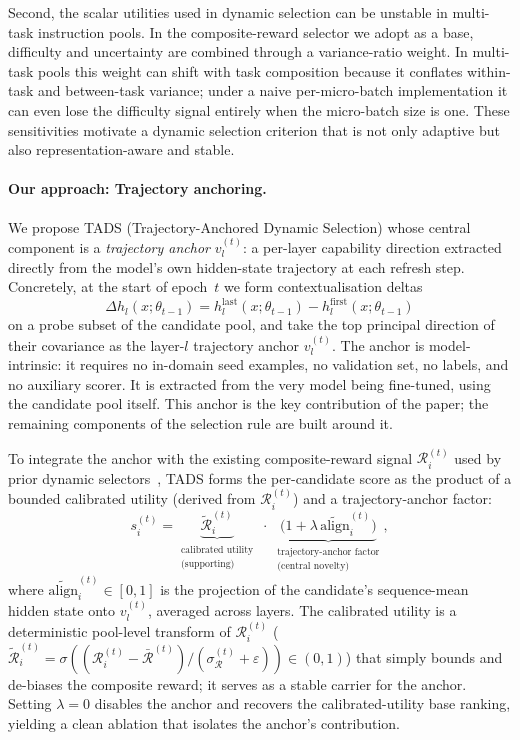 Second, the scalar utilities used in dynamic selection can be
unstable in multi-task instruction pools. In the composite-reward
selector we adopt as a base, difficulty and uncertainty are
combined through a variance-ratio weight. In multi-task pools this
weight can shift with task composition because it conflates
within-task and between-task variance; under a naive
per-micro-batch implementation it can even lose the difficulty
signal entirely when the micro-batch size is one. These
sensitivities motivate a dynamic selection criterion that is not
only adaptive but also representation-aware and stable.

\paragraph{Our approach: Trajectory anchoring.}
We propose \textsc{TADS} (Trajectory-Anchored Dynamic Selection)
whose central component is a \emph{trajectory anchor}
$v_l^{(t)}$: a per-layer capability direction extracted directly
from the model's own hidden-state trajectory at each refresh step.
Concretely, at the start of epoch~$t$ we form contextualisation
deltas
\[
\Delta h_l(x;\theta_{t-1})
=
h_l^{\mathrm{last}}(x;\theta_{t-1})
-
h_l^{\mathrm{first}}(x;\theta_{t-1})
\]
on a probe subset of the candidate pool, and take the top principal
direction of their covariance as the layer-$l$ trajectory anchor
$v_l^{(t)}$. The anchor is model-intrinsic: it requires no
in-domain seed examples, no validation set, no labels, and no
auxiliary scorer. It is extracted from the very model being
fine-tuned, using the candidate pool itself. This anchor is the
key contribution of the paper; the remaining components of the
selection rule are built around it.

To integrate the anchor with the existing composite-reward signal
$\mathcal{R}_i^{(t)}$ used by prior dynamic
selectors~\cite{kung2023activeit, sun2025dots}, \textsc{TADS} forms
the per-candidate score as the product of a bounded calibrated
utility (derived from $\mathcal{R}_i^{(t)}$) and a
trajectory-anchor factor:
\[
s_i^{(t)}
=
\underbrace{\tilde{\mathcal{R}}_i^{(t)}}_{\substack{\text{calibrated utility}\\[1pt]\text{(supporting)}}}
\;\cdot\;
\underbrace{\bigl(1+\lambda\,\widetilde{\mathrm{align}}_i^{(t)}\bigr)}_{\substack{\text{trajectory-anchor factor}\\[1pt]\text{(central novelty)}}},
\]
where $\widetilde{\mathrm{align}}_i^{(t)}\in[0,1]$ is the
projection of the candidate's sequence-mean hidden state onto
$v_l^{(t)}$, averaged across layers. The calibrated utility is a
deterministic pool-level transform of $\mathcal{R}_i^{(t)}$
($\tilde{\mathcal{R}}_i^{(t)} = \sigma((\mathcal{R}_i^{(t)} -
\bar{\mathcal{R}}^{(t)})/(\sigma_{\mathcal{R}}^{(t)} +
\varepsilon)) \in (0,1)$) that simply bounds and de-biases the
composite reward; it serves as a stable carrier for the anchor.
Setting $\lambda=0$ disables the anchor and recovers the
calibrated-utility base ranking, yielding a clean ablation that
isolates the anchor's contribution.

